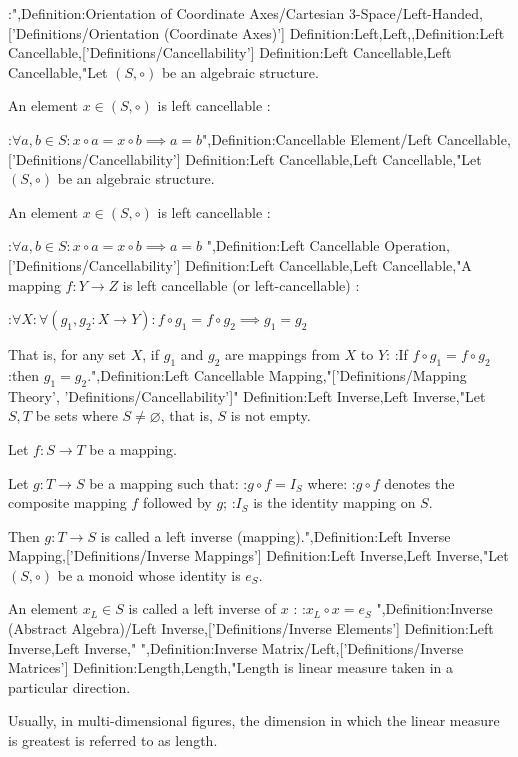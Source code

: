 :",Definition:Orientation of Coordinate Axes/Cartesian 3-Space/Left-Handed,['Definitions/Orientation (Coordinate Axes)']
Definition:Left,Left,,Definition:Left Cancellable,['Definitions/Cancellability']
Definition:Left Cancellable,Left Cancellable,"Let $\left( S, \circ \right)$ be an algebraic structure.


An element $x \in \left( S, \circ \right)$ is left cancellable :

:$\forall a, b \in S: x \circ a = x \circ b \implies a = b$",Definition:Cancellable Element/Left Cancellable,['Definitions/Cancellability']
Definition:Left Cancellable,Left Cancellable,"Let $\left( S, \circ \right)$ be an algebraic structure.


An element $x \in \left( S, \circ \right)$ is left cancellable :

:$\forall a, b \in S: x \circ a = x \circ b \implies a = b$
",Definition:Left Cancellable Operation,['Definitions/Cancellability']
Definition:Left Cancellable,Left Cancellable,"A mapping $f: Y \to Z$ is left cancellable (or left-cancellable) :

:$\forall X: \forall \left( g_1, g_2: X \to Y \right): f \circ g_1 = f \circ g_2 \implies g_1 = g_2$

That is, for any set $X$, if $g_1$ and $g_2$ are mappings from $X$ to $Y$:
:If $f \circ g_1 = f \circ g_2$
:then $g_1 = g_2$.",Definition:Left Cancellable Mapping,"['Definitions/Mapping Theory', 'Definitions/Cancellability']"
Definition:Left Inverse,Left Inverse,"Let $S, T$ be sets where $S \ne \varnothing$, that is, $S$ is not empty.

Let $f: S \to T$ be a mapping.


Let $g: T \to S$ be a mapping such that:
:$g \circ f = I_S$
where:
:$g \circ f$ denotes the composite mapping $f$ followed by $g$;
:$I_S$ is the identity mapping on $S$.


Then $g: T \to S$ is called a left inverse (mapping).",Definition:Left Inverse Mapping,['Definitions/Inverse Mappings']
Definition:Left Inverse,Left Inverse,"Let $\left( S, \circ \right)$ be a monoid whose identity is $e_S$.

An element $x_L \in S$ is called a left inverse of $x$ :
:$x_L \circ x = e_S$
",Definition:Inverse (Abstract Algebra)/Left Inverse,['Definitions/Inverse Elements']
Definition:Left Inverse,Left Inverse,"
",Definition:Inverse Matrix/Left,['Definitions/Inverse Matrices']
Definition:Length,Length,"Length is linear measure taken in a particular direction.

Usually, in multi-dimensional figures, the dimension in which the linear measure is greatest is referred to as length.

